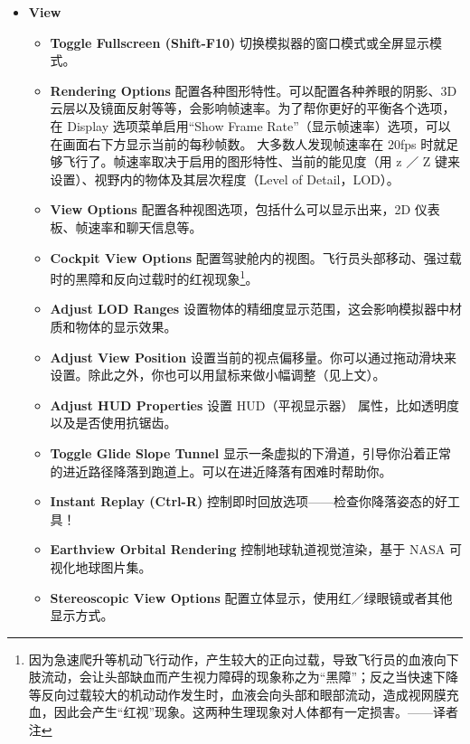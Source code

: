 \begin{itemize}
\ifchinese
 \item \textbf{View}
 \begin{itemize}
  \item \textbf{Toggle Fullscreen (Shift-F10)} 切换模拟器的窗口模式或全屏显示模式。
  \item \textbf{Rendering Options} 配置各种图形特性。可以配置各种养眼的阴影、3D 云层以及镜面反射等等，会影响帧速率。为了帮你更好的平衡各个选项，在 Display 选项菜单启用``Show Frame Rate''（显示帧速率）选项，可以在画面右下方显示当前的每秒帧数。
  大多数人发现帧速率在 20fps 时就足够飞行了。帧速率取决于启用的图形特性、当前的能见度（用 z ／ Z 键来设置）、视野内的物体及其层次程度（Level of Detail，LOD）。
  \item \textbf{View Options} 配置各种视图选项，包括什么可以显示出来，2D 仪表板、帧速率和聊天信息等。
  \item \textbf{Cockpit View Options} 配置驾驶舱内的视图。飞行员头部移动、强过载时的黑障和反向过载时的红视现象\footnote{因为急速爬升等机动飞行动作，产生较大的正向过载，导致飞行员的血液向下肢流动，会让头部缺血而产生视力障碍的现象称之为“黑障”；反之当快速下降等反向过载较大的机动动作发生时，血液会向头部和眼部流动，造成视网膜充血，因此会产生“红视”现象。这两种生理现象对人体都有一定损害。——译者注}。
  \item \textbf{Adjust LOD Ranges} 设置物体的精细度显示范围，这会影响模拟器中材质和物体的显示效果。
  \item \textbf{Adjust View Position} 设置当前的视点偏移量。你可以通过拖动滑块来设置。除此之外，你也可以用鼠标来做小幅调整（见上文）。
  \item \textbf{Adjust HUD Properties} 设置 HUD（平视显示器） 属性，比如透明度以及是否使用抗锯齿。
  \item \textbf{Toggle Glide Slope Tunnel} 显示一条虚拟的下滑道，引导你沿着正常的进近路径降落到跑道上。可以在进近降落有困难时帮助你。
  \item \textbf{Instant Replay (Ctrl-R)} 控制即时回放选项——检查你降落姿态的好工具！
  \item \textbf{Earthview Orbital Rendering} 控制地球轨道视觉渲染，基于 NASA 可视化地球图片集。
  \item \textbf{Stereoscopic View Options} 配置立体显示，使用红／绿眼镜或者其他显示方式。
 \end{itemize}  
\fi
\iffalse
{}
\end{itemize}
